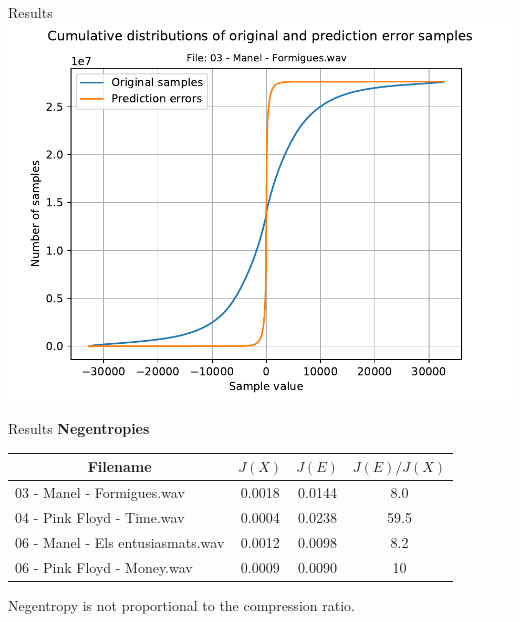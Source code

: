 \documentclass[usenames,dvipsnames]{beamer}
\begin{document}
\begin{frame}{Results}
\centering
\includegraphics[scale=0.62]{graphics/03 - Manel - Formigues.wav_hist_cum.pdf}
\end{frame}

\begin{frame}{Results}
\textbf{Negentropies}
\vspace{1em}

\small
\begin{tabular}{|
		>{}l |
		>{}c |
		>{}c |c|}
	\hline
	\multicolumn{1}{|c|}{\cellcolor[HTML]{d6cefc}Filename} & \cellcolor[HTML]{d6cefc}$J(X)$ & \cellcolor[HTML]{d6cefc}$J(E)$ & \cellcolor[HTML]{d6cefc}$J(E)/J(X)$ \\ \hline
	03 - Manel - Formigues.wav                             & 0.0018                       & 0.0144                       & 8.0                               \\ \hline
	04 - Pink Floyd - Time.wav                             & 0.0004                       & 0.0238                       & 59.5                              \\ \hline
	06 - Manel - Els entusiasmats.wav                      & 0.0012                       & 0.0098                       & 8.2                               \\ \hline
	06 - Pink Floyd - Money.wav                            & 0.0009                       & 0.0090                       & 10                                \\ \hline
\end{tabular}
\normalsize
\vspace{1.5em}

Negentropy is not proportional to the compression ratio.
\end{frame}
\end{document}
